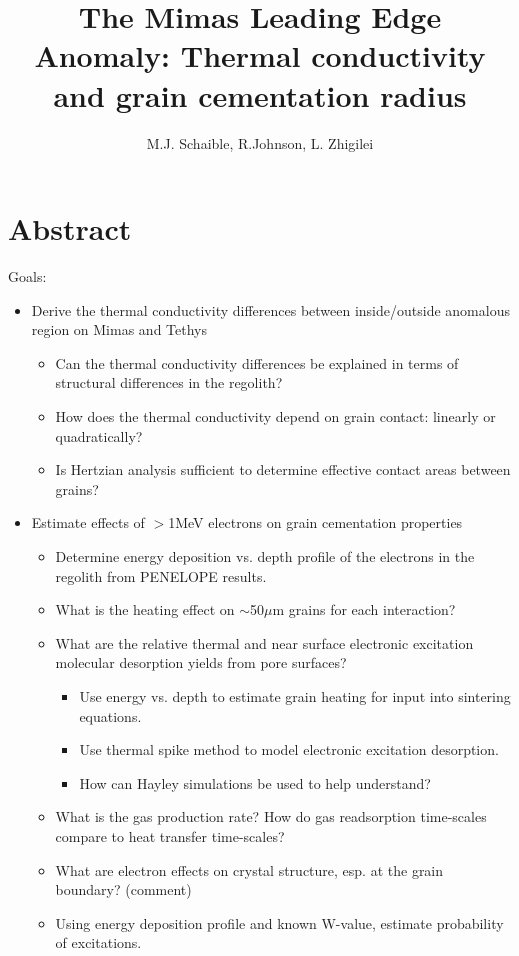 \documentclass[11pt]{article} %
\title{The Mimas Leading Edge Anomaly: Thermal conductivity and grain cementation radius}
\author{M.J. Schaible, R.Johnson, L. Zhigilei}
\begin{document}
\maketitle

\section{Abstract}

	Goals:
	\begin{itemize}
	\item Derive the thermal conductivity differences between inside/outside anomalous region on Mimas and Tethys
		\begin{itemize}
		\item Can the thermal conductivity differences be explained in terms of structural differences in the regolith?
		\item How does the thermal conductivity depend on grain contact: linearly or quadratically?
		\item Is Hertzian analysis sufficient to determine effective contact areas between grains?
		\end{itemize}
	\item Estimate effects of $>$1MeV electrons on grain cementation properties
		\begin{itemize}
		\item Determine energy deposition vs. depth profile of the electrons in the regolith from PENELOPE results.
		\item What is the heating effect on $\sim$50$\mu$m grains for each interaction?
		\item What are the relative thermal and near surface electronic excitation molecular desorption yields from pore surfaces?
			\begin{itemize}
			\item Use energy vs. depth to estimate grain heating for input into sintering equations. 
			\item Use thermal spike method to model electronic excitation desorption.
			\item How can Hayley simulations be used to help understand?
			\end{itemize}
		\item What is the gas production rate? How do gas readsorption time-scales compare to heat transfer time-scales?
		\item What are electron effects on crystal structure, esp. at the grain boundary? (comment)
		\item Using energy deposition profile and known W-value, estimate probability of excitations.

\end{itemize}
\end{itemize}
\end{document}

